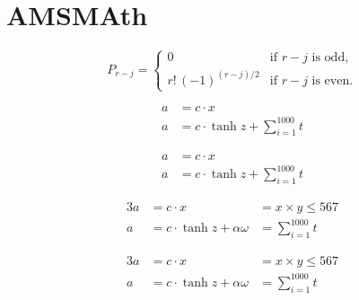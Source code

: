 \documentclass[12pt,ngerman,parskip=half]{scrartcl}
\begin{document}
\section{AMSMAth}

\begin{equation}
P_{r-j}=\begin{cases}
0& \text{if $r-j$ is odd},\\
r!\,(-1)^{(r-j)/2}& \text{if $r-j$ is even}.
\end{cases}
\end{equation}

\begin{align} %
a &= c \cdot x \\
a &= c \cdot \tanh z + \sum_{i=1}^{1000} t
\end{align}

\begin{align*} %
a &= c \cdot x \\
a &= c \cdot \tanh z + \sum_{i=1}^{1000} t
\end{align*}

\begin{alignat}{3}
a &= c \cdot x &= x\times y \leq 567 \\
a &= c \cdot \tanh z + \alpha\omega &= \sum_{i=1}^{1000} t
\end{alignat}

\begin{alignat*}{3}
a &= c \cdot x &= x\times y \leq 567 \\
a &= c \cdot \tanh z + \alpha\omega &= \sum_{i=1}^{1000} t
\end{alignat*}
\end{document}
